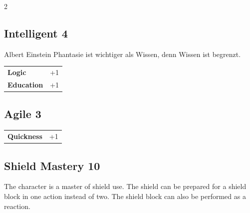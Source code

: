 \begin{multicols}{2}
\begin{tcolorbox}

\end{tcolorbox}

\begin{tcolorbox}
    \subsection*{Intelligent \hfill \small{4 }}
    \tcblower


\begin{pquote}{Albert Einstein}
Phantasie ist wichtiger als Wissen, denn Wissen ist begrenzt.
\end{pquote}

\vspace{3mm}

\begin{tabular}{@{}ll@{}}
    \textbf{Logic} & +1\\
    \textbf{Education} & +1\\
\end{tabular}


\end{tcolorbox}

\begin{tcolorbox}
    \subsection*{Agile \hfill \small{3 }}
    \tcblower




\begin{tabular}{@{}ll@{}}
    \textbf{Quickness} & +1\\
\end{tabular}


\end{tcolorbox}

\begin{tcolorbox}
    \subsection*{Shield Mastery \hfill \small{10 }}
    \tcblower
The character is a master of shield use. The shield can be prepared for a shield block in one action instead of two. The shield block can also be performed as a reaction.



\end{tcolorbox}
\end{multicols}
